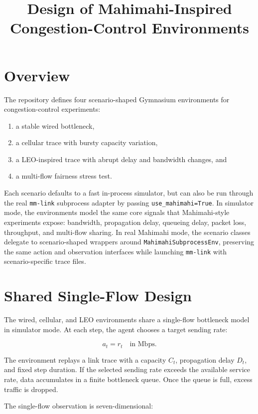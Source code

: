 \documentclass[11pt]{article}
\title{Design of Mahimahi-Inspired Congestion-Control Environments}
\author{}
\date{}
\begin{document}
\maketitle

\section{Overview}

The repository defines four scenario-shaped Gymnasium environments for
congestion-control experiments:

\begin{enumerate}[label=(\arabic*)]
  \item a stable wired bottleneck,
  \item a cellular trace with bursty capacity variation,
  \item a LEO-inspired trace with abrupt delay and bandwidth changes, and
  \item a multi-flow fairness stress test.
\end{enumerate}

Each scenario defaults to a fast in-process simulator, but can also be run
through the real \texttt{mm-link} subprocess adapter by passing
\texttt{use\_mahimahi=True}. In simulator mode, the environments model the same
core signals that Mahimahi-style experiments expose: bandwidth, propagation
delay, queueing delay, packet loss, throughput, and multi-flow sharing. In real
Mahimahi mode, the scenario classes delegate to scenario-shaped wrappers around
\texttt{MahimahiSubprocessEnv}, preserving the same action and observation
interfaces while launching \texttt{mm-link} with scenario-specific trace files.

\section{Shared Single-Flow Design}

The wired, cellular, and LEO environments share a single-flow bottleneck model
in simulator mode. At each step, the agent chooses a target sending rate:

\[
  a_t = r_t \quad \text{in Mbps.}
\]

The environment replays a link trace with a capacity \(C_t\), propagation delay
\(D_t\), and fixed step duration. If the selected sending rate exceeds the
available service rate, data accumulates in a finite bottleneck queue. Once the
queue is full, excess traffic is dropped.

The single-flow observation is seven-dimensional:
\end{document}

